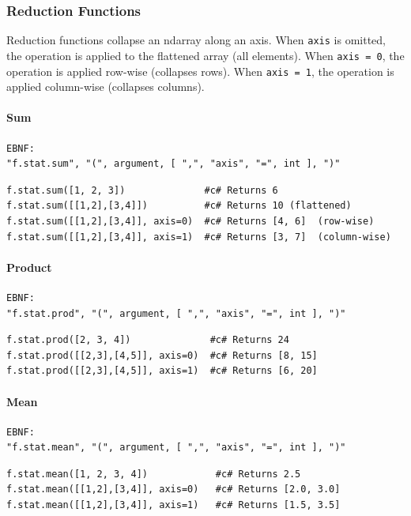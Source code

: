 \subsubsection{Reduction Functions}
Reduction functions collapse an ndarray along an axis. When \texttt{axis} is omitted, the operation is applied to the flattened array (all elements). When \texttt{axis = 0}, the operation is applied row-wise (collapses rows). When \texttt{axis = 1}, the operation is applied column-wise (collapses columns).

\paragraph{Sum}
\begin{verbatim}
EBNF:
"f.stat.sum", "(", argument, [ ",", "axis", "=", int ], ")"
\end{verbatim}
\begin{verbatim}
f.stat.sum([1, 2, 3])              #c# Returns 6
f.stat.sum([[1,2],[3,4]])          #c# Returns 10 (flattened)
f.stat.sum([[1,2],[3,4]], axis=0)  #c# Returns [4, 6]  (row-wise)
f.stat.sum([[1,2],[3,4]], axis=1)  #c# Returns [3, 7]  (column-wise)
\end{verbatim}

\paragraph{Product}
\begin{verbatim}
EBNF:
"f.stat.prod", "(", argument, [ ",", "axis", "=", int ], ")"
\end{verbatim}
\begin{verbatim}
f.stat.prod([2, 3, 4])              #c# Returns 24
f.stat.prod([[2,3],[4,5]], axis=0)  #c# Returns [8, 15]
f.stat.prod([[2,3],[4,5]], axis=1)  #c# Returns [6, 20]
\end{verbatim}

\paragraph{Mean}
\begin{verbatim}
EBNF:
"f.stat.mean", "(", argument, [ ",", "axis", "=", int ], ")"
\end{verbatim}
\begin{verbatim}
f.stat.mean([1, 2, 3, 4])            #c# Returns 2.5
f.stat.mean([[1,2],[3,4]], axis=0)   #c# Returns [2.0, 3.0]
f.stat.mean([[1,2],[3,4]], axis=1)   #c# Returns [1.5, 3.5]
\end{verbatim}

